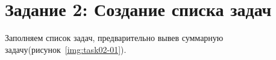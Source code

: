 \section{Задание 2: Создание списка задач}

Заполняем список задач, предварительно вывев суммарную задачу(рисунок~\ref{img:task02-01}).

